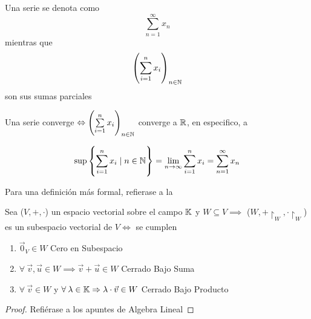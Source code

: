 \begin{notation}
    Una serie se denota como 
    \begin{equation*}
        \sum\limits_{n=1}^{\infty} x_n
    \end{equation*}
    mientras que 
    \begin{equation*}
        {\left( \sum\limits_{i=1}^{n} x_i \right)}_{n \in \mathbb{N}} 
    \end{equation*}
    son sus sumas parciales
\end{notation}

\begin{remark}
    Una serie converge $ \Leftrightarrow {\left( \sum\limits_{i=1}^{n} x_i \right)}_{n \in \mathbb{N}} $ converge a $\mathbb{R}$, en especifico, a  
    
    \begin{equation*}
        \sup \left\{ \sum\limits_{i=1}^{n} x_i \mid n \in \N  \right\} = \lim\limits_{n\to\infty} \sum\limits_{i=1}^{n} x_i  = \sum\limits_{n=1}^{\infty} x_n
    \end{equation*}

    Para una definición más formal, refierase a la 
\end{remark}

\begin{theorem} \label{theom6}
    Sea ($V, +, \cdot$) un espacio vectorial sobre el campo $\mathbb{K}$ y $W \subseteq V \implies$  ($W,+ \restriction_W,\cdot  {\restriction}_{W}$) es un subespacio vectorial de $V \iff$ se cumplen

    \begin{enumerate}[label={\roman*})]
        \item ${\vec{0}}_{V} \in W$ \hfill \textcolor{red!70!black}{Cero en Subespacio}
        \item $\forall \: \vec{v}, \vec{u} \in W \implies \vec{v} + \vec{u} \in W $ \hfill \textcolor{red!70!black}{Cerrado Bajo Suma}
        \item $\forall \: \vec{v} \in W $ y $\forall \: \lambda \in \mathbb{K} \Rightarrow \lambda \cdot \vec{v} \in W$ \hfill \textcolor{red!70!black}{Cerrado Bajo Producto}
    \end{enumerate}
\end{theorem}

\begin{proof}
    Refiérase a los apuntes de Algebra Lineal
\end{proof}

